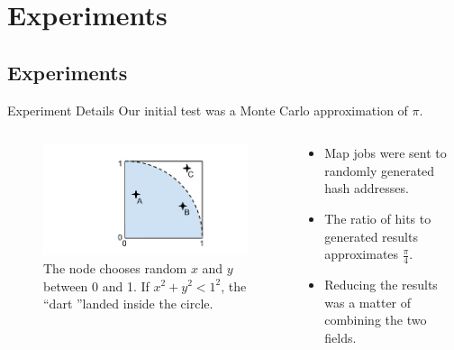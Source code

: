 \documentclass[11pt]{beamer}
\begin{document}
\section{Experiments}

\subsection{Experiments}

\begin{frame}{Experiment Details}
Our initial test was a Monte Carlo approximation of $\pi$.
\begin{columns}[T]


\begin{column}{.5\textwidth}

\begin{figure}
    \includegraphics[width=\linewidth]{dartboard}
    \caption{The node chooses random $x$ and $y$ between 0 and 1. If $x^{2} + y^{2} < 1^{2} $, the ``dart ''landed inside the circle.}
    \label{dartboard}
\end{figure}


\end{column}





\begin{column}{.5\textwidth}
\begin{itemize}
	\item Map jobs were sent to randomly generated hash addresses.
	\item The ratio of hits to generated results approximates $\frac{\pi}{4}$.
	\item Reducing the results was a matter of combining the two fields.
\end{itemize}
\end{column}
\end{columns}
\end{frame}
\end{document}
